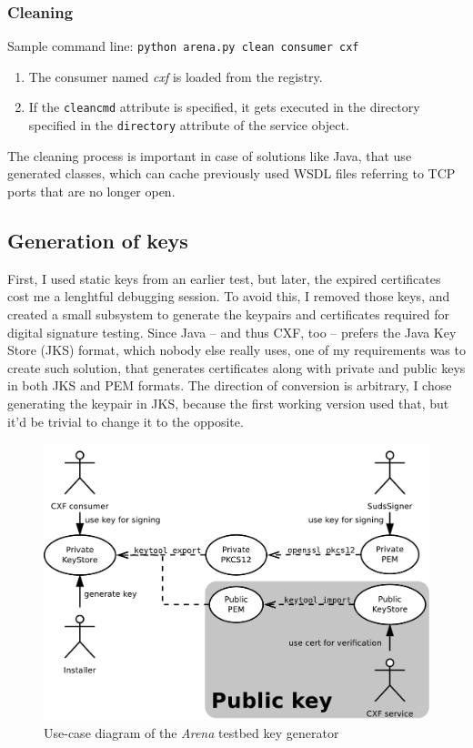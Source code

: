 \subsubsection{Cleaning}

Sample command line: \verb|python arena.py clean consumer cxf|

\begin{enumerate}
 \item The consumer named \emph{cxf} is loaded from the registry.
 \item If the \verb|cleancmd| attribute is specified, it gets executed in the directory specified in the \verb|directory| attribute of the service object.
\end{enumerate}

The cleaning process is important in case of solutions like Java, that use generated classes, which can cache previously used WSDL files referring to TCP ports that are no longer open.

\subsection{Generation of keys}

First, I used static keys from an earlier test, but later, the expired certificates cost me a lenghtful debugging session. To avoid this, I removed those keys, and created a small subsystem to generate the keypairs and certificates required for digital signature testing. Since Java -- and thus CXF, too -- prefers the Java Key Store (JKS) format, which nobody else really uses, one of my requirements was to create such solution, that generates certificates along with private and public keys in both JKS and PEM formats. The direction of conversion is arbitrary, I chose generating the keypair in JKS, because the first working version used that, but it'd be trivial to change it to the opposite.

\begin{figure}[htbp]
 \centering
 \includegraphics[width=14cm]{images/ucdArenaKeys.pdf}
 \caption{Use-case diagram of the \emph{Arena} testbed key generator}
 \label{fig:ucdArenaKeys}
\end{figure}

